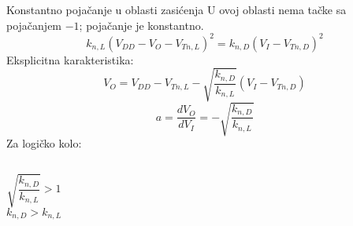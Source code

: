 \begin{frame}[label=09_1-s052]{Konstantno pojačanje u oblasti zasićenja}\setlength{\parskip}{2pt}\setlength{\abovedisplayskip}{4pt}\setlength{\belowdisplayskip}{4pt}\setlength{\abovedisplayshortskip}{3pt}\setlength{\belowdisplayshortskip}{3pt}
U ovoj oblasti nema tačke sa pojačanjem $-1$; pojačanje je konstantno.\[k_{n,L}(V_{DD}-V_O-V_{Tn,L})^2=k_{n,D}(V_I-V_{Tn,D})^2\]
Eksplicitna karakteristika:\[V_O=V_{DD}-V_{Tn,L}-\sqrt{\frac{k_{n,D}}{k_{n,L}}}(V_I-V_{Tn,D})\]
\[a=\frac{dV_O}{dV_I}=-\sqrt{\frac{k_{n,D}}{k_{n,L}}}\]
Za logičko kolo:\begin{columns}[T,onlytextwidth]\[\sqrt{\frac{k_{n,D}}{k_{n,L}}}>1\]
\[k_{n,D}>k_{n,L}\]
\end{columns}
\end{frame}
